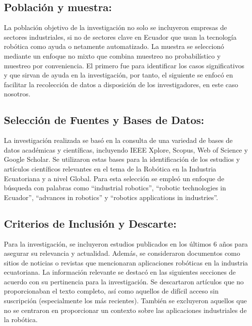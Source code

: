 \documentclass[conference]{IEEEtran}
\begin{document}
\subsection{Población y muestra:}

La población objetivo de la investigación no solo se incluyeron empresas de sectores industriales, si no de sectores clave en Ecuador que usan la tecnología robótica como ayuda o netamente automatizado. La muestra se seleccionó mediante un enfoque no mixto que combina muestreo no probabilístico y muestreo por conveniencia. El primero fue para identificar los casos significativos y que sirvan de ayuda en la investigación, por tanto, el siguiente se enfocó en facilitar la recolección de datos a disposición de los investigadores, en este caso nosotros.

\subsection{Selección de Fuentes y Bases de Datos:}

La investigación realizada se basó en la consulta de una variedad de bases de datos académicas y científicas, incluyendo IEEE Xplore, Scopus, Web of Science y Google Scholar. Se utilizaron estas bases para la identificación de los estudios y artículos científicos relevantes en el tema de la Robótica en la Industria Ecuatoriana y a nivel Global. Para esta selección se empleó un enfoque de búsqueda con palabras como “industrial robotics”, “robotic technologies in Ecuador”, “advances in robotics” y “robotics applications in industries”.

\subsection{Criterios de Inclusión y Descarte:}

Para la investigación,  se incluyeron estudios publicados en los últimos 6 años para asegurar su relevancia y actualidad. Además, se consideraron documentos como sitios de noticias o revistas que mencionaran aplicaciones robóticas en la industria ecuatoriana. La información relevante se destacó en las siguientes secciones de acuerdo con su pertinencia para la investigación. Se descartaron artículos que no proporcionaban el texto completo, así como aquellos de difícil acceso sin suscripción (especialmente los más recientes). También se excluyeron aquellos que no se centraron en proporcionar un contexto sobre las aplicaciones industriales de la robótica.
\end{document}
